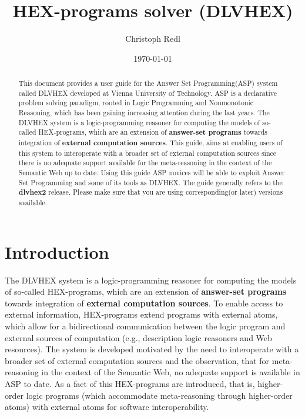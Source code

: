 \documentclass[14pt,a4paper, titlepage]{article}
\begin{document}
\setcounter{page}{3}
\title{HEX-programs solver (DLVHEX)}
\author{Christoph Redl}
\date{\today}
\maketitle

\newcommand{\dlvhex}{{\sc DLVHEX}}
\newcommand{\hex}{{\sc HEX}}



\begin{abstract}
This document provides a user guide for the Answer Set Programming(ASP) system called \dlvhex{} developed at Vienna University of Technology. ASP is a declarative problem solving paradigm, rooted in Logic Programming and Nonmonotonic Reasoning, which has been gaining increasing attention during the last years. The \dlvhex{} system is a logic-programming reasoner for computing the models of so-called \hex{}-programs, which are an extension of \textbf{answer-set programs} towards integration of \textbf{external computation sources}. This guide, aims at enabling users of this system to interoperate with a broader set of external computation sources since there is no adequate support available for the meta-reasoning in the context of the Semantic Web up to date. Using this guide ASP novices will be able to exploit Answer Set Programming and some of its tools as \dlvhex{}. The guide generally refers to the \textbf{dlvhex2} release. Please make sure that you are using corresponding(or later) versions available.     
\end{abstract}

\tableofcontents

\newpage

\section{Introduction} %
The \dlvhex{} system is a logic-programming reasoner for computing the models of so-called \hex{}-programs, which are an extension of \textbf{answer-set programs} towards integration of \textbf{external computation sources}. To enable access to external information, \hex{}-programs extend programs with external atoms, which allow for a bidirectional communication between the logic program and external sources of computation (e.g., description logic reasoners and Web resources). \cite{extatoms} The system is developed motivated by the need to interoperate with a broader set of external computation sources and the observation, that for meta-reasoning in the context of the Semantic Web, no adequate support is available in ASP to date. As a fact of this \hex{}-programs are introduced, that is, higher-order logic programs (which accommodate meta-reasoning through higher-order atoms) with external atoms for software interoperability.
\end{document}
